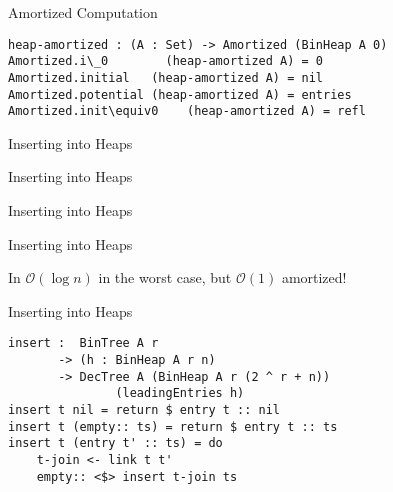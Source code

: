 \documentclass[11pt]{beamer}
\begin{document}
    \begin{frame}[fragile]{Amortized Computation}
        \begin{lstlisting}[emph={BinHeap,heap,amortized}]
heap-amortized : (A : Set) -> Amortized (BinHeap A 0)
Amortized.i\_0        (heap-amortized A) = 0
Amortized.initial   (heap-amortized A) = nil
Amortized.potential (heap-amortized A) = entries
Amortized.init\equiv0    (heap-amortized A) = refl
        \end{lstlisting}
    \end{frame}

    \begin{frame}{Inserting into Heaps}
        \begin{center}
            
        \end{center}
    \end{frame}

    \begin{frame}{Inserting into Heaps}
        \begin{center}
            
        \end{center}
    \end{frame}

    \begin{frame}{Inserting into Heaps}
        \begin{center}
            
        \end{center}
    \end{frame}

    \begin{frame}{Inserting into Heaps}
        \begin{center}
            
        \end{center}

        In $\mathcal O(\log n)$ in the worst case, but $\mathcal O(1)$ amortized!
    \end{frame}

    \begin{frame}[fragile]{Inserting into Heaps}
        \begin{lstlisting}[emph={BinTree,BinHeap,entry,empty,nil}]
insert :  BinTree A r
       -> (h : BinHeap A r n)
       -> DecTree A (BinHeap A r (2 ^ r + n))
               (leadingEntries h)
insert t nil = return $ entry t :: nil
insert t (empty:: ts) = return $ entry t :: ts
insert t (entry t' :: ts) = do
    t-join <- link t t'
    empty:: <$> insert t-join ts
        \end{lstlisting}
    \end{frame}
\end{document}
